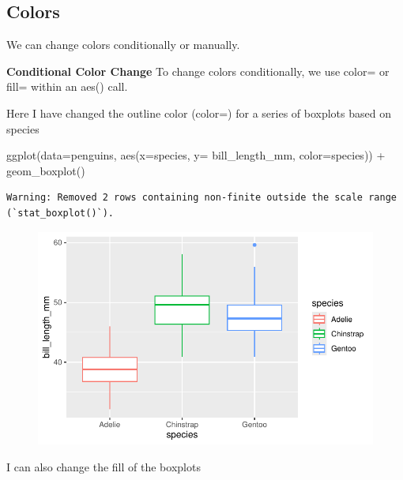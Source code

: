 \documentclass[
  letterpaper,
  DIV=11,
  numbers=noendperiod]{scrartcl}
\newenvironment{Shaded}{\begin{snugshade}}{\end{snugshade}}
\newcommand{\AttributeTok}[1]{\textcolor[rgb]{0.40,0.45,0.13}{#1}}
\newcommand{\FunctionTok}[1]{\textcolor[rgb]{0.28,0.35,0.67}{#1}}
\newcommand{\NormalTok}[1]{\textcolor[rgb]{0.00,0.23,0.31}{#1}}
\newcommand{\SpecialCharTok}[1]{\textcolor[rgb]{0.37,0.37,0.37}{#1}}
\begin{document}
\subsection{\texorpdfstring{\textbf{Colors}}{Colors}}

We can change colors conditionally or manually.

\textbf{Conditional Color Change} To change colors conditionally, we use
color= or fill= within an aes() call.

Here I have changed the outline color (color=) for a series of boxplots
based on species

\begin{Shaded}
\begin{Highlighting}[]
\FunctionTok{ggplot}\NormalTok{(}\AttributeTok{data=}\NormalTok{penguins, }\FunctionTok{aes}\NormalTok{(}\AttributeTok{x=}\NormalTok{species, }\AttributeTok{y=}\NormalTok{ bill\_length\_mm, }\AttributeTok{color=}\NormalTok{species)) }\SpecialCharTok{+}
  \FunctionTok{geom\_boxplot}\NormalTok{()}
\end{Highlighting}
\end{Shaded}

\begin{verbatim}
Warning: Removed 2 rows containing non-finite outside the scale range
(`stat_boxplot()`).
\end{verbatim}

\begin{figure}[H]

{\centering \includegraphics{Lab_2_files/figure-pdf/unnamed-chunk-23-1.pdf}

}

\end{figure}

I can also change the fill of the boxplots
\end{document}
